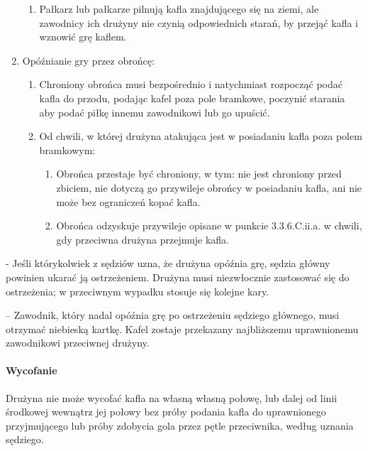 \documentclass[12pt]{article}
\newcommand\bluecard{\bgroup\color{blue}\markoverwith{\textcolor{blue}{\rule[-0.5ex]{2pt}{0.4pt}}}\ULon}
\newcommand\other{\bgroup\color{green}\markoverwith{\textcolor{green}{\rule[-0.5ex]{2pt}{0.4pt}}}\ULon}
\begin{document}
\begin{enumerate}
\begin{enumerate}
		      \item Pałkarz lub pałkarze pilnują kafla znajdującego się na ziemi, ale
		            zawodnicy ich drużyny nie czynią odpowiednich starań, by przejąć kafla i
		            wznowić grę kaflem.
	      \end{enumerate}

	\item Opóźnianie gry przez obrońcę:
	      \begin{enumerate}
		      \item Chroniony obrońca musi bezpośrednio i natychmiast rozpocząć podać
		            kafla do przodu, podając kafel poza pole bramkowe, poczynić starania aby
		            podać piłkę innemu zawodnikowi lub go upuścić.

		      \item Od chwili, w której drużyna atakująca jest w posiadaniu kafla poza
		            polem bramkowym:
		            \begin{enumerate}
			            \item Obrońca przestaje być chroniony, w tym: nie jest chroniony przed
			                  zbiciem, nie dotyczą go przywileje obrońcy w posiadaniu kafla, ani nie
			                  może bez ograniczeń kopać kafla.

			            \item Obrońca odzyskuje przywileje opisane w punkcie 3.3.6.C.ii.a.
			                  w chwili, gdy przeciwna drużyna przejmuje kafla.
		            \end{enumerate}
	      \end{enumerate}
\end{enumerate}

\other{Ostrzeżenie} - Jeśli którykolwiek z sędziów uzna, że drużyna
opóźnia grę, sędzia główny powinien ukarać ją ostrzeżeniem. Drużyna musi
niezwłocznie zastosować się do ostrzeżenia; w przeciwnym wypadku stosuje
się kolejne kary.

\bluecard{Niebieska kartka} -- Zawodnik, który nadal opóźnia grę po
ostrzeżeniu sędziego głównego, musi otrzymać niebieską kartkę. Kafel
zostaje przekazany najbliższemu uprawnionemu zawodnikowi przeciwnej
drużyny.

\paragraph{Wycofanie}
Drużyna nie może wycofać kafla na własną
własną połowę, lub dalej od linii środkowej wewnątrz jej połowy bez
próby podania kafla do uprawnionego przyjmującego lub próby zdobycia
gola przez pętle przeciwnika, według uznania sędziego.
\end{document}
